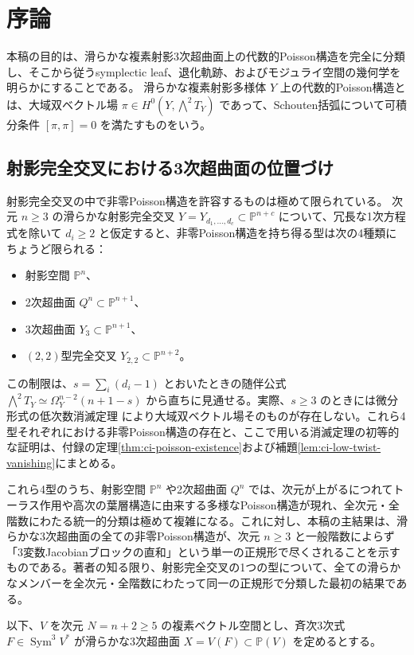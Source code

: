 \section{序論}\label{sec:paperA-introduction}
本稿の目的は、滑らかな複素射影3次超曲面上の代数的Poisson構造を完全に分類し、そこから従うsymplectic leaf、退化軌跡、およびモジュライ空間の幾何学を明らかにすることである。
滑らかな複素射影多様体 $Y$ 上の代数的Poisson構造とは、大域双ベクトル場 $\pi\in H^0(Y,\bigwedge^2T_Y)$ であって、Schouten括弧について可積分条件 $[\pi,\pi]=0$ を満たすものをいう。

\subsection*{射影完全交叉における3次超曲面の位置づけ}
射影完全交叉の中で非零Poisson構造を許容するものは極めて限られている。
次元 $n\ge3$ の滑らかな射影完全交叉 $Y=Y_{d_1,\ldots,d_c}\subset\mathbb P^{n+c}$ について、冗長な1次方程式を除いて $d_i\ge2$ と仮定すると、非零Poisson構造を持ち得る型は次の4種類にちょうど限られる：
\begin{itemize}
  \item 射影空間 $\mathbb P^n$、
  \item 2次超曲面 $Q^n\subset\mathbb P^{n+1}$、
  \item 3次超曲面 $Y_3\subset\mathbb P^{n+1}$、
  \item $(2,2)$型完全交叉 $Y_{2,2}\subset\mathbb P^{n+2}$。
\end{itemize}
この制限は、$s=\sum_i(d_i-1)$ とおいたときの随伴公式 $\bigwedge^2T_Y\simeq\Omega_Y^{n-2}(n+1-s)$ から直ちに見通せる。実際、$s\ge3$ のときには微分形式の低次数消滅定理 \cite[Lemma~4.1]{FuHwangCI} により大域双ベクトル場そのものが存在しない。これら4型それぞれにおける非零Poisson構造の存在と、ここで用いる消滅定理の初等的な証明は、付録の定理\ref{thm:ci-poisson-existence}および補題\ref{lem:ci-low-twist-vanishing}にまとめる。

これら4型のうち、射影空間 $\mathbb P^n$ や2次超曲面 $Q^n$ では、次元が上がるにつれてトーラス作用や高次の葉層構造に由来する多様なPoisson構造が現れ、全次元・全階数にわたる統一的分類は極めて複雑になる。これに対し、本稿の主結果は、滑らかな3次超曲面の全ての非零Poisson構造が、次元 $n\ge3$ と一般階数によらず「3変数Jacobianブロックの直和」という単一の正規形で尽くされることを示すものである。著者の知る限り、射影完全交叉の1つの型について、全ての滑らかなメンバーを全次元・全階数にわたって同一の正規形で分類した最初の結果である。

以下、$V$ を次元 $N=n+2\ge5$ の複素ベクトル空間とし、斉次3次式 $F\in\operatorname{Sym}^3V^*$ が滑らかな3次超曲面 $X=V(F)\subset\mathbb P(V)$ を定めるとする。

